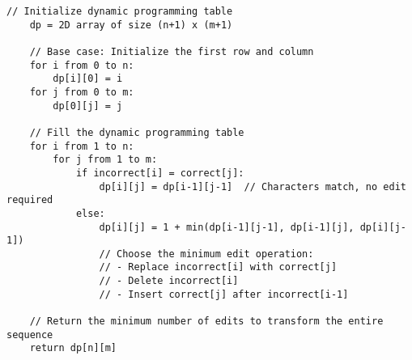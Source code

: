 \documentclass[a4paper]{exam}
\begin{document}
\begin{questions}
\begin{solution}
\begin{enumerate}
\begin{lstlisting}[style=pseudocode, caption={Dynamic Programming Solution}, label={lst:dynprog}]
    // Initialize dynamic programming table
    dp = 2D array of size (n+1) x (m+1)
    
    // Base case: Initialize the first row and column
    for i from 0 to n:
        dp[i][0] = i
    for j from 0 to m:
        dp[0][j] = j
    
    // Fill the dynamic programming table
    for i from 1 to n:
        for j from 1 to m:
            if incorrect[i] = correct[j]:
                dp[i][j] = dp[i-1][j-1]  // Characters match, no edit required
            else:
                dp[i][j] = 1 + min(dp[i-1][j-1], dp[i-1][j], dp[i][j-1])
                // Choose the minimum edit operation:
                // - Replace incorrect[i] with correct[j]
                // - Delete incorrect[i]
                // - Insert correct[j] after incorrect[i-1]
    
    // Return the minimum number of edits to transform the entire sequence
    return dp[n][m]
            \end{lstlisting}
            

\end{enumerate}
\end{solution}
\end{questions}
\end{document}
